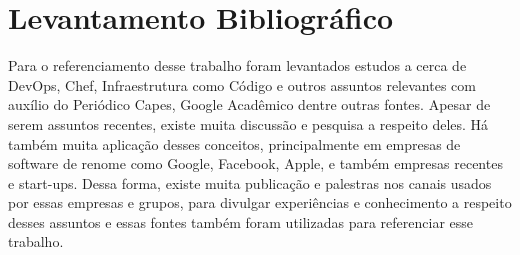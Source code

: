 \section{Levantamento Bibliográfico}

Para o referenciamento desse trabalho foram levantados estudos a cerca de DevOps, Chef, Infraestrutura como Código e outros assuntos relevantes com auxílio do Periódico Capes, Google Acadêmico dentre outras fontes. Apesar de serem assuntos recentes, existe muita discussão e pesquisa a respeito deles. Há também muita aplicação desses conceitos, principalmente em empresas de software de renome como Google, Facebook, Apple, e também empresas recentes e start-ups. Dessa forma, existe muita publicação e palestras nos canais usados por essas empresas e grupos, para divulgar experiências e conhecimento a respeito desses assuntos e essas fontes também foram utilizadas para referenciar esse trabalho. 
